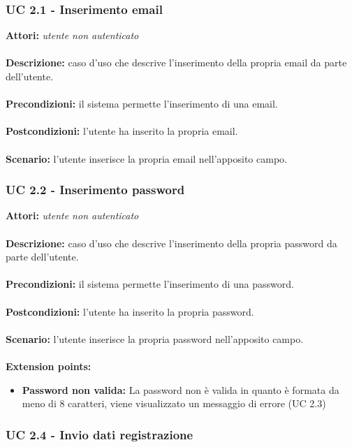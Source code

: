 \documentclass[a4paper,11pt]{article}
\begin{document}
\subsubsection{UC 2.1 - Inserimento email}

\textbf{Attori:} \textit{utente non autenticato}
\\ \\
\textbf{Descrizione:} caso d'uso che descrive l'inserimento della propria email da parte dell'utente.\\
\\
\textbf{Precondizioni:} il sistema permette l'inserimento di una email.\\
\\
\textbf{Postcondizioni:} l’utente ha inserito la propria email.\\
\\
\textbf{Scenario:} l’utente inserisce la propria email nell'apposito campo.\\


\subsubsection{UC 2.2 - Inserimento password}

\textbf{Attori:} \textit{utente non autenticato}
\\ \\
\textbf{Descrizione:} caso d'uso che descrive l'inserimento della propria password da parte dell'utente.\\
\\
\textbf{Precondizioni:} il sistema permette l'inserimento di una password.\\
\\
\textbf{Postcondizioni:} l’utente ha inserito la propria password.\\
\\
\textbf{Scenario:} l’utente inserisce la propria password nell'apposito campo.\\
\\
\textbf{Extension points:} 
\begin{itemize}
	\item \textbf{Password non valida:} La password non è valida in quanto è formata da meno di 8 caratteri, viene visualizzato un messaggio di errore (UC 2.3)
\end{itemize}


\subsubsection{UC 2.4 - Invio dati registrazione}
\end{document}

